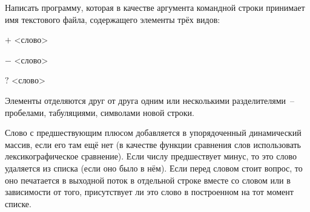 

Написать программу, которая в качестве аргумента командной строки
принимает имя текстового файла, содержащего элементы трёх видов:
\begin{description}
\item{$+$} <слово>
\item{$-$} <слово>
\item{$?$} <слово>
\end{description}

Элементы отделяются друг от друга одним или несколькими
разделителями~-- пробелами, табуляциями, символами новой строки.

Слово
с предшествующим плюсом добавляется в упорядоченный динамический
массив, если его там ещё нет (в качестве функции сравнения слов
использовать лексикографическое сравнение). Если числу предшествует
минус, то это слово удаляется из списка (если оно было в нём). Если перед
словом стоит вопрос, то оно печатается в выходной поток в отдельной
строке вместе со словом  или  в зависимости от того, присутствует ли
это слово в построенном на тот момент списке.
